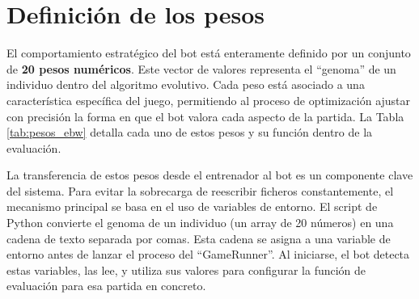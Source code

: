 \section{Definición de los pesos} \label{sec:definicion_pesos}

El comportamiento estratégico del bot está enteramente definido por un conjunto de \textbf{20 pesos numéricos}. Este vector de valores representa el ``genoma'' de un individuo dentro del algoritmo evolutivo. Cada peso está asociado a una característica específica del juego, permitiendo al proceso de optimización ajustar con precisión la forma en que el bot valora cada aspecto de la partida. La Tabla \ref{tab:pesos_ebw} detalla cada uno de estos pesos y su función dentro de la evaluación.

La transferencia de estos pesos desde el entrenador al bot es un componente clave del sistema. Para evitar la sobrecarga de reescribir ficheros constantemente, el mecanismo principal se basa en el uso de variables de entorno. El script de Python convierte el genoma de un individuo (un array de 20 números) en una cadena de texto separada por comas. Esta cadena se asigna a una variable de entorno antes de lanzar el proceso del ``GameRunner''. Al iniciarse, el bot detecta estas variables, las lee, y utiliza sus valores para configurar la función de evaluación para esa partida en concreto.

